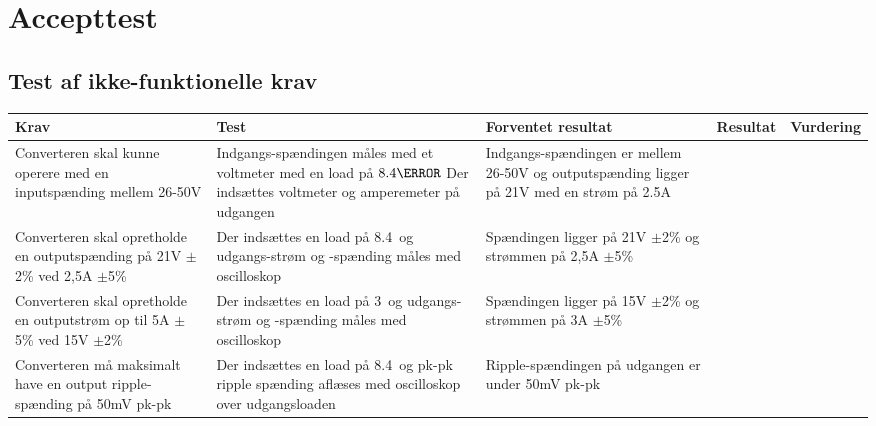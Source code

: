 \chapter{Accepttest}




\section{Test af ikke-funktionelle krav}

\begin{tabularx}{\textwidth}{|X|X|X|X|X|}
	\hline
	\textbf{Krav} & \textbf{Test} & \textbf{Forventet resultat} & \textbf{Resultat} & \textbf{Vurdering} \\ \hline
	Converteren skal kunne operere med en inputspænding mellem 26-50V & Indgangs-spændingen måles med et voltmeter med en load på $8.4\ohm$ Der indsættes voltmeter og amperemeter på udgangen & Indgangs-spændingen er mellem 26-50V og outputspænding ligger på 21V med en strøm på 2.5A & & \\ \hline
	Converteren skal opretholde en outputspænding på 21V $\pm$2\% ved 2,5A $\pm$5\% & Der indsættes en load på 8.4\ohm\ og udgangs-strøm og -spænding måles med oscilloskop & Spændingen ligger på 21V $\pm$2\% og strømmen på 2,5A $\pm$5\% && \\ \hline
	Converteren skal opretholde en outputstrøm op til 5A $\pm$5\% ved 15V $\pm$2\% & Der indsættes en load på 3\ohm\ og udgangs-strøm og -spænding måles med oscilloskop & Spændingen ligger på 15V $\pm$2\% og strømmen på 3A $\pm$5\% && \\ \hline
	Converteren må maksimalt have en output ripple-spænding på 50mV pk-pk & Der indsættes en load på 8.4\ohm\ og pk-pk ripple spænding aflæses med oscilloskop over udgangsloaden & Ripple-spændingen på udgangen er under 50mV pk-pk && \\ \hline
\end{tabularx}




